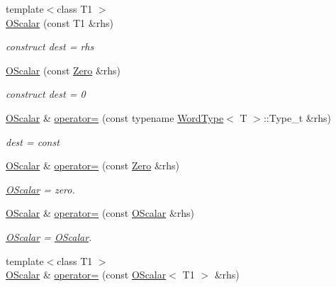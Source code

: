 \begin{DoxyCompactItemize}
{\footnotesize template$<$class T1 $>$ }\\\mbox{\hyperlink{classENSEM_1_1OScalar_a63525278c1ba085f57cdc4aafe50aaa9}{O\+Scalar}} (const T1 \&rhs)
\begin{DoxyCompactList}\small\item\em construct dest = rhs \end{DoxyCompactList}\item 
\mbox{\hyperlink{classENSEM_1_1OScalar_a9bc3830b1a4af2e67da73871396ae06c}{O\+Scalar}} (const \mbox{\hyperlink{structENSEM_1_1Zero}{Zero}} \&rhs)
\begin{DoxyCompactList}\small\item\em construct dest = 0 \end{DoxyCompactList}\item 
\mbox{\hyperlink{classENSEM_1_1OScalar}{O\+Scalar}} \& \mbox{\hyperlink{classENSEM_1_1OScalar_a88bbb49d2879dba60c29d7792a8af8dc}{operator=}} (const typename \mbox{\hyperlink{structENSEM_1_1WordType}{Word\+Type}}$<$ T $>$\+::Type\+\_\+t \&rhs)
\begin{DoxyCompactList}\small\item\em dest = const \end{DoxyCompactList}\item 
\mbox{\hyperlink{classENSEM_1_1OScalar}{O\+Scalar}} \& \mbox{\hyperlink{classENSEM_1_1OScalar_a4fdfed29e219b358e05588826e672932}{operator=}} (const \mbox{\hyperlink{structENSEM_1_1Zero}{Zero}} \&rhs)
\begin{DoxyCompactList}\small\item\em \mbox{\hyperlink{classENSEM_1_1OScalar}{O\+Scalar}} = zero. \end{DoxyCompactList}\item 
\mbox{\hyperlink{classENSEM_1_1OScalar}{O\+Scalar}} \& \mbox{\hyperlink{classENSEM_1_1OScalar_a7c36649387edf21f3fa19f9ae63d4aca}{operator=}} (const \mbox{\hyperlink{classENSEM_1_1OScalar}{O\+Scalar}} \&rhs)
\begin{DoxyCompactList}\small\item\em \mbox{\hyperlink{classENSEM_1_1OScalar}{O\+Scalar}} = \mbox{\hyperlink{classENSEM_1_1OScalar}{O\+Scalar}}. \end{DoxyCompactList}\item 
{\footnotesize template$<$class T1 $>$ }\\\mbox{\hyperlink{classENSEM_1_1OScalar}{O\+Scalar}} \& \mbox{\hyperlink{classENSEM_1_1OScalar_aa6400023b45eed547bcb84c395fa1520}{operator=}} (const \mbox{\hyperlink{classENSEM_1_1OScalar}{O\+Scalar}}$<$ T1 $>$ \&rhs)

\end{DoxyCompactItemize}
